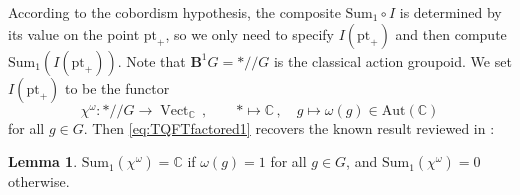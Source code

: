 \documentclass[12pt]{scrartcl}
\newcommand{\boldB}{\boldsymbol{B}}
\newcommand{\C}{\mathds{C}}
\newcommand{\be}{\begin{equation}}
\newcommand{\ee}{\end{equation}}
\def\lra{\longrightarrow}
\def\lmt{\longmapsto}
\newcommand{\Vect}{\operatorname{Vect}}
\theoremstyle{definition}
\newtheorem{lemma}[definition]{Lemma}
\numberwithin{equation}{section}
\numberwithin{definition}{section}
\numberwithin{figure}{section}
\begin{document}
According to the cobordism hypothesis, the composite $\textrm{Sum}_1 \circ I$ is determined by its value on the point $\text{pt}_+$, so we only need to specify $I(\text{pt}_+)$ and then compute $\textrm{Sum}_1(I(\text{pt}_+))$. 
Note that $\boldB^1 G = */\!\!/ G$ is the classical action groupoid. 
We set $I(\text{pt}_+)$ to be the functor
\be
\chi^\omega \colon */\!\!/ G \lra \Vect_\C 
\, , \qquad 
* \lmt \C
\, , \quad 
g \lmt \omega(g) \in \text{Aut}(\C)
\ee
for all $g \in G$. 
Then \eqref{eq:TQFTfactored1} recovers the known result reviewed in \cite[Sect.\,1]{FHLT}: 

\begin{lemma}
$\text{Sum}_1(\chi^\omega) = \C$ if $\omega(g) = 1$ for all $g\in G$, and $\text{Sum}_1(\chi^\omega) = 0$ otherwise. 
\end{lemma}
\end{document}
